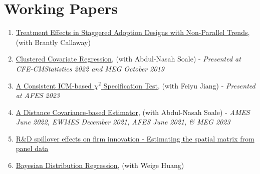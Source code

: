 \documentclass[12pt,letterpaper]{article}
\begin{document}
\section*{Working Papers}
\begin{enumerate}
  
  \item \href{https://arxiv.org/pdf/2308.02899.pdf}{Treatment Effects in Staggered Adoption Designs with Non-Parallel Trends}, (with Brantly Callaway)

  \item \href{https://arxiv.org/pdf/2302.09255.pdf}{Clustered Covariate Regression}, (with Abdul-Nasah Soale) - \textit{Presented at CFE-CMStatistics 2022 and MEG October 2019}
  
  \item \href{https://arxiv.org/pdf/2208.13370.pdf}{A Consistent ICM-based $\chi^2$ Specification Test}, (with Feiyu Jiang) - \textit{Presented at AFES 2023}
  
	\item \href{https://arxiv.org/pdf/2102.07008.pdf}{A Distance Covariance-based Estimator}, (with Abdul-Nasah Soale) - \textit{AMES June 2022, EWMES December 2021, AFES June 2021, \&  MEG 2023}
	
		\item  \href{https://estsyawo.github.io/Tsyawo_JMP.pdf#}{R\&D spillover effects on firm innovation - Estimating the spatial matrix from panel data}
	
	\item \href{https://papers.ssrn.com/sol3/papers.cfm?abstract_id=3048658}{Bayesian Distribution Regression}, (with Weige Huang)
\end{enumerate}


\end{document}

